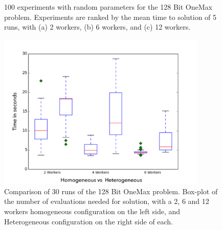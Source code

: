 \documentclass{llncs}
\begin{document}
\begin{figure}[b]
    \centering

    \caption{100 experiments with random parameters for the 128 Bit OneMax problem.
    Experiments are ranked by the mean time to solution of 5 runs, with   
    (a) 2 workers, (b) 6 workers, and (c) 12 workers.}
    \label{fig:effort}
\end{figure}



\begin{figure}[t]
    \centering
        \includegraphics[width=10cm]{img/one_max_comp.png}
    \caption{Comparison of 30 runs of the 128 Bit OneMax problem. 
    Box-plot of the number of evaluations needed for solution, with a 2, 6 and 12 workers
    homogeneous configuration on the left side, and Heterogeneous configuration on the
    right side of each.
    }
    \label{fig:comp-onemax}
\end{figure}
\end{document}
